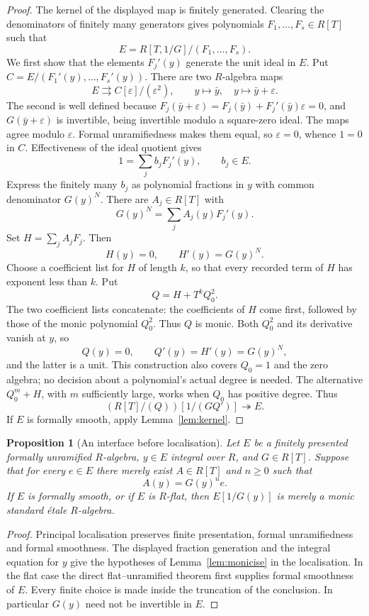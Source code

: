 \documentclass[11pt]{article}
\newtheorem{proposition}[theorem]{Proposition}
\begin{document}
\begin{proof}
The kernel of the displayed map is finitely generated. Clearing the
denominators of finitely many generators gives polynomials
$F_1,\ldots,F_s\in R[T]$ such that
\[
             E=R[T,1/G]/(F_1,\ldots,F_s).
\]
We first show that the elements $F_j'(y)$ generate the unit ideal in
$E$. Put $C=E/(F_1'(y),\ldots,F_s'(y))$. There are two $R$-algebra
maps
\[
                  E\rightrightarrows C[\varepsilon]/(\varepsilon^2),
             \qquad y\longmapsto\bar y,\quad
                    y\longmapsto\bar y+\varepsilon.
\]
The second is well defined because
$F_j(\bar y+\varepsilon)=F_j(\bar y)+F_j'(\bar y)\varepsilon=0$,
and $G(\bar y+\varepsilon)$ is invertible, being invertible modulo a
square-zero ideal. The maps agree modulo $\varepsilon$. Formal
unramifiedness makes them equal, so $\varepsilon=0$, whence $1=0$ in
$C$. Effectiveness of the ideal quotient gives
\[
                         1=\sum_j b_j F_j'(y),\qquad b_j\in E.
\]
Express the finitely many $b_j$ as polynomial fractions in $y$ with
common denominator $G(y)^N$. There are $A_j\in R[T]$ with
\[
                G(y)^N=\sum_j A_j(y)F_j'(y).
\]
Set $H=\sum_j A_j F_j$. Then
\[
                      H(y)=0,\qquad H'(y)=G(y)^N.
\]
Choose a coefficient list for $H$ of length $k$, so that every recorded
term of $H$ has exponent less than $k$. Put
\[
                              Q=H+T^kQ_0^2.
\]
The two coefficient lists concatenate: the coefficients of $H$ come
first, followed by those of the monic polynomial $Q_0^2$. Thus $Q$ is
monic. Both $Q_0^2$ and its derivative vanish at $y$, so
\[
                  Q(y)=0,\qquad Q'(y)=H'(y)=G(y)^N,
\]
and the latter is a unit. This construction also covers $Q_0=1$ and
the zero algebra; no decision about a polynomial's actual degree is
needed. The alternative $Q_0^m+H$, with $m$ sufficiently large,
works when $Q_0$ has positive degree. Thus
\[
                 (R[T]/(Q))[1/(GQ')]\twoheadrightarrow E.
\]
If $E$ is formally smooth, apply Lemma~\ref{lem:kernel}.
\end{proof}

\begin{proposition}[An interface before localisation]\label{prop:interface}
Let $E$ be a finitely presented formally unramified $R$-algebra,
$y\in E$ integral over $R$, and $G\in R[T]$. Suppose that for every
$e\in E$ there merely exist $A\in R[T]$ and $n\geq0$ such that
\[
                         A(y)=G(y)^n e.
\]
If $E$ is formally smooth, or if $E$ is $R$-flat, then
$E[1/G(y)]$ is merely a monic standard \'etale $R$-algebra.
\end{proposition}
\begin{proof}
Principal localisation preserves finite presentation, formal
unramifiedness and formal smoothness. The displayed fraction
generation and the integral equation for $y$ give the hypotheses of
Lemma~\ref{lem:monicise} in the localisation. In the flat case the
direct flat--unramified theorem first supplies formal smoothness of
$E$. Every finite choice is made inside the truncation of the
conclusion. In particular $G(y)$ need not be invertible in $E$.
\end{proof}
\end{document}
